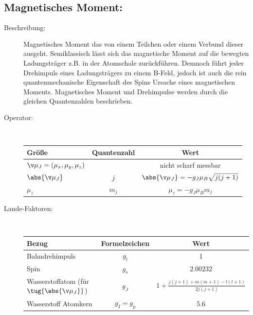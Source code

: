 \documentclass[twocolumn]{summery_4.1}
\begin{document}
\subsection{Magnetisches Moment:}
\begin{description}
    \item[Beschreibung:] Magnetisches Moment das von einem Teilchen oder einem Verbund dieser ausgeht. Semiklassisch lässt sich das magnetische Moment auf die bewegten Ladungsträger z.B. in der Atomschale zurückführen. Demnoch führt jeder Drehimpuls eines Ladungsträgers zu einem B-Feld, jedoch ist auch die rein quantenmechanische Eigenschaft des Spins Ursache eines magnetischen Moments. Magnetisches Moment und Drehimpulse werden durch die gleichen Quantenzahlen beschrieben.
    
    \item[Operator:]\,\vspace{-1ex}
    
    \begin{center}
        \begin{tabular}{@{}lcc@{}}
            \toprule 
            {\bf Größe} & {\bf Quantenzahl} & {\bf Wert}\\\midrule
            \(\v \mu_J = (\mu_x,\mu_y,\mu_z)\) & & nicht scharf messbar\\
            \(\abs{\v \mu_J}\) & \(j\) & \(\abs{\v \mu_J} = -g_J \mu_B \sqrt{j(j+1)}\)\\
            \(\mu_z\) & \(m_j\)  & \(\mu_z = - g_J \mu_B m_j\)\\\bottomrule
        \end{tabular}
    \end{center}\vspace{1ex}

    \item[Lande-Faktoren:]\,\vspace{-1ex}
    \begin{center}
        \begin{tabular}{@{}lcc@{}}
            \toprule
            {\bf Bezug} & {\bf Formelzeichen} & {\bf Wert}\\\midrule
            Bahndrehimpuls & \(g_l\) & 1\\
            Spin & \(g_s\) & \(2.00232\)\\
            Wasserstoffatom (für \(\tug{\abs{\v \mu_J}}\))& \(g_J\) & \(1 + \frac{j(j+1) + m(m+1) - l(l+1)}{2 j(j+1)} \)\\
            Wasserstoff Atomkern & \(g_I=g_p\) & 5.6\\\bottomrule
        \end{tabular}
    \end{center}
\end{description}
\end{document}
